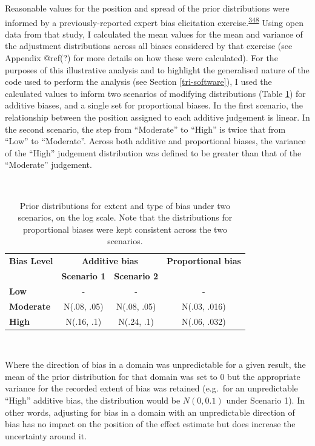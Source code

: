 \documentclass[a4paper, twoside]{templates/ociamthesis}
\begin{document}
Reasonable values for the position and spread of the prior distributions were informed by a previously-reported expert bias elicitation exercise.\textsuperscript{\protect\hyperlink{ref-turner2009}{348}} Using open data from that study, I calculated the mean values for the mean and variance of the adjustment distributions across all biases considered by that exercise (see Appendix @ref(?) for more details on how these were calculated). For the purposes of this illustrative analysis and to highlight the generalised nature of the code used to perform the analysis (see Section \ref{tri-software}), I used the calculated values to inform two scenarios of modifying distributions (Table \ref{tab:priorsAdd-table}) for additive biases, and a single set for proportional biases. In the first scenario, the relationship between the position assigned to each additive judgement is linear. In the second scenario, the step from ``Moderate'' to ``High'' is twice that from ``Low'' to ``Moderate''. Across both additive and proportional biases, the variance of the ``High'' judgement distribution was defined to be greater than that of the ``Moderate'' judgement.

~





\begin{table}[H]

\caption[Prior distributions mapped to different extents of bias.]{\label{tab:priorsAdd-table}Prior distributions for extent and type of bias under two scenarios, on the log scale. Note that the distributions for proportional biases were kept consistent across the two scenarios.}
\centering
\begin{tabular}[t]{>{}lccc}
\toprule
\multicolumn{1}{c}{\textbf{Bias Level}} & \multicolumn{2}{c}{\textbf{Additive bias}} & \multicolumn{1}{c}{\textbf{Proportional bias}} \\
\textbf{} & \textbf{Scenario 1} & \textbf{Scenario 2} & \textbf{}\\
\midrule
\textbf{Low} & - & - & -\\
\midrule
\textbf{Moderate} & N(.08, .05) & N(.08, .05) & N(.03, .016)\\
\midrule
\textbf{High} & N(.16, .1) & N(.24, .1) & N(.06, .032)\\
\bottomrule
\end{tabular}
\end{table}

~

Where the direction of bias in a domain was unpredictable for a given result, the mean of the prior distribution for that domain was set to 0 but the appropriate variance for the recorded extent of bias was retained (e.g.~for an unpredictable ``High'' additive bias, the distribution would be \(N(0,0.1)\) under Scenario 1). In other words, adjusting for bias in a domain with an unpredictable direction of bias has no impact on the position of the effect estimate but does increase the uncertainty around it.
\end{document}
